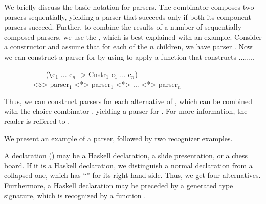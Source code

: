 \begin{small}\end{small}


We briefly discuss the basic notation for parsers.  The \p{<*>} combinator composes two parsers sequentially, yielding a parser that succeeds only if both its component parsers succeed. Further, to combine the results of a number of sequentially composed parsers, we use the \p{<\$>}, 
which is best explained with an example. Consider a constructor  and assume that for each of the $n$ children, we have parser . Now we can construct a parser for  by using \p{<\$>} to apply a function that constructs ........
\fromHere

\ttfamily\begin{small}\begin{tabbing}
~~~~~~~~~~~ (\verb|\|c$_1$ ... c$_{n}$ -> Cnstr$_1$ c$_1$ ... c$_{n}$)\\
~~~~~~~~<\$> parser$_{1}$ <*> parser$_{1}$ <*> ... <*> parser$_{n}$ \\
\end{tabbing}\end{small}\rmfamily

Thus, we can construct parsers for each alternative of , which can be combined with the choice combinator \p{<|>}, yielding a parser for . For more information, the reader is reffered to \cite{swierstra01parsers}.

We present an example of a parser, followed by two recognizer examples.


A declaration () may be a Haskell declaration, a slide presentation, or a chess board. If it is a Haskell declaration, we distinguish a normal declaration from a collapsed one, which has ``'' for its right-hand side. Thus, we get four alternatives. Furthermore, a Haskell declaration may be preceded by a generated type signature, which is recognized by a function .

